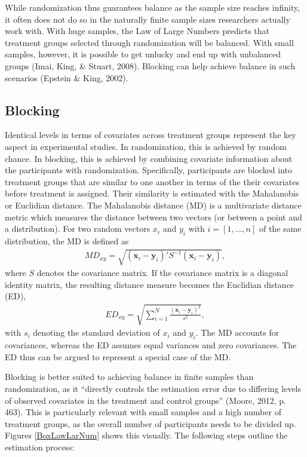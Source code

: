 \documentclass[12pt,econ]{sources/authesis}
\begin{document}
While randomization thus guarantees balance as the sample size reaches infinity, it often does not do so in the naturally finite sample sizes researchers actually work with. With huge samples, the Law of Large Numbers predicts that treatment groups selected through randomization will be balanced. With small samples, however, it is possible to get unlucky and end up with unbalanced groups (Imai, King, \& Stuart, 2008). Blocking can help achieve balance in such scenarios (Epstein \& King, 2002).

\hypertarget{ordblock-theory-blocking}{%
\subsection{Blocking}\label{ordblock-theory-blocking}}

Identical levels in terms of covariates across treatment groups represent the key aspect in experimental studies. In randomization, this is achieved by random chance. In blocking, this is achieved by combining covariate information about the participants with randomization. Specifically, participants are blocked into treatment groups that are similar to one another in terms of the their covariates before treatment is assigned. Their similarity is estimated with the Mahalanobis or Euclidian distance. The Mahalanobis distance (MD) is a multivariate distance metric which measures the distance between two vectors (or between a point and a distribution). For two random vectors \(x_i\) and \(y_i\) with \(i = [1,\ldots,n]\) of the same distribution, the MD is defined as
\begin{align}
MD_{xy} = \sqrt{(\bm{x}_i - \bm{y}_i)' S^{-1} (\bm{x}_i - \bm{y}_i)},
\end{align}
where \(S\) denotes the covariance matrix. If the covariance matrix is a diagonal identity matrix, the resulting distance measure becomes the Euclidian distance (ED),
\begin{align}
ED_{xy} = \sqrt{\sum_{i=1}^N \frac{(\bm{x}_i - \bm{y}_i)^2}{s^2}},
\end{align}
with \(s_i\) denoting the standard deviation of \(x_i\) and \(y_i\). The MD accounts for covariances, whereas the ED assumes equal variances and zero covariances. The ED thus can be argued to represent a special case of the MD.

Blocking is better suited to achieving balance in finite samples than randomization, as it ``directly controls the estimation error due to differing levels of observed covariates in the treatment and control groups'' (Moore, 2012, p. 463). This is particularly relevant with small samples and a high number of treatment groups, as the overall number of participants needs to be divided up. Figures \ref{BoxLawLarNum} shows this visually. The following steps outline the estimation process:
\end{document}
